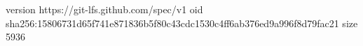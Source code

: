 version https://git-lfs.github.com/spec/v1
oid sha256:15806731d65f741e871836b5f80c43cdc1530c4ff6ab376ed9a996f8d79fac21
size 5936
